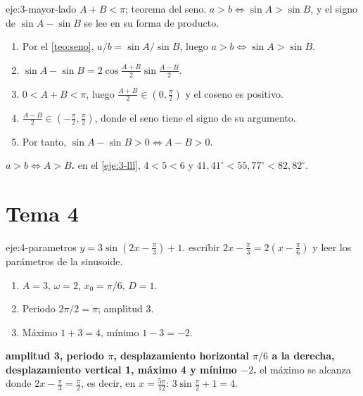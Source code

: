 \begin{solucion}{eje:3-mayor-lado}
\datos $A+B<\pi$; teorema del seno.
\planteamiento $a>b\iff\sin A>\sin B$, y el signo de $\sin A-\sin B$ se lee en su forma de producto.
\pasos
\begin{enumerate}[label=\arabic*.]
  \item Por el \cref{teo:seno}, $a/b=\sin A/\sin B$, luego $a>b\iff\sin A>\sin B$.
  \item $\sin A-\sin B=2\cos\frac{A+B}{2}\sin\frac{A-B}{2}$.
  \item $0<A+B<\pi$, luego $\frac{A+B}{2}\in(0,\frac{\pi}{2})$ y el coseno es positivo.
  \item $\frac{A-B}{2}\in(-\frac{\pi}{2},\frac{\pi}{2})$, donde el seno tiene el signo de su argumento.
  \item Por tanto, $\sin A-\sin B>0\iff A-B>0$.
\end{enumerate}
\resultado \textbf{$a>b\iff A>B$.}
\comprobacion en el \cref{eje:3-lll}, $4<5<6$ y $41{,}41^{\circ}<55{,}77^{\circ}<82{,}82^{\circ}$.
\end{solucion}

\section{Tema 4}

\begin{solucion}{eje:4-parametros}
\datos $y=3\sin(2x-\frac{\pi}{3})+1$.
\planteamiento escribir $2x-\frac{\pi}{3}=2(x-\frac{\pi}{6})$ y leer los parámetros de la sinusoide.
\pasos
\begin{enumerate}[label=\arabic*.]
  \item $A=3$, $\omega=2$, $x_0=\pi/6$, $D=1$.
  \item Periodo $2\pi/2=\pi$; amplitud $3$.
  \item Máximo $1+3=4$, mínimo $1-3=-2$.
\end{enumerate}
\resultado \textbf{amplitud 3, periodo $\pi$, desplazamiento horizontal $\pi/6$ a la derecha, desplazamiento vertical 1, máximo 4 y mínimo $-2$.}
\comprobacion el máximo se alcanza donde $2x-\frac{\pi}{3}=\frac{\pi}{2}$, es decir, en $x=\frac{5\pi}{12}$: $3\sin\frac{\pi}{2}+1=4$.
\end{solucion}

